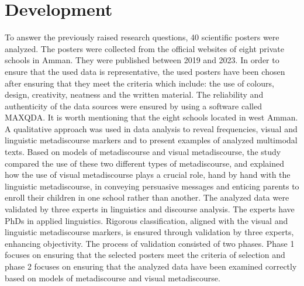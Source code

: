 \documentclass[english]{textolivre}
\begin{document}
\section{Development}\label{sec-fmt-manuscrito}
To answer the previously raised research questions, 40 scientific posters were analyzed. The posters were collected from the official websites of eight private schools in Amman. They were published between 2019 and 2023. In order to ensure that the used data is representative, the used posters have been chosen after ensuring that they meet the criteria which include: the use of colours, design, creativity, neatness and the written material. The reliability and authenticity of the data sources were ensured by using a software called MAXQDA. It is worth mentioning that the eight schools located in west Amman. A qualitative approach was used in data analysis to reveal frequencies, visual and linguistic metadiscourse markers and to present examples of analyzed multimodal texts. Based on  models of metadiscourse and  visual metadiscourse, the study compared the use of these two different types of metadiscourse, and explained how the use of visual metadiscourse plays a crucial role, hand by hand with the linguistic metadiscourse, in conveying persuasive messages and enticing parents to enroll their children in one school rather than another. The analyzed data were validated by three experts in linguistics and discourse analysis. The experts have PhDs in applied linguistics. Rigorous classification, aligned with the visual and linguistic metadiscourse markers, is ensured through validation by three experts, enhancing objectivity. The process of validation consisted of two phases. Phase 1 focuses on ensuring that the selected posters meet the criteria of selection and phase 2 focuses on ensuring that the analyzed data have been examined correctly based on  models of metadiscourse and  visual metadiscourse.
\end{document}

